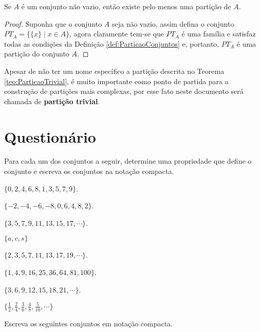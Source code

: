 \begin{teorema}\label{teo:ParticaoTrivial}
	Se $A$ é um conjunto não vazio, então existe pelo menos uma partição de $A$.
\end{teorema}

\begin{proof}
	Suponha que o conjunto $A$ seja não vazio, assim defina o conjunto $PT_A = \{\{x\} \mid x \in A\}$, agora claramente tem-se que $PT_A$ é uma família e satisfaz todas as condições da Definição \ref{def:ParticaoConjuntos} e, portanto, $PT_A$ é uma partição do conjunto $A$.
\end{proof}

\begin{nota}
  Apesar de não ter um nome específico a partição descrita no Teorema \ref{teo:ParticaoTrivial}, é muito importante como ponto de partida para a construção de partições mais complexas, por esse fato neste documento será chamada de \textbf{partição trivial}.
\end{nota}

\section{Questionário}\label{sec:Questionario1part1}

\begin{questao}\label{test:Conjuntos1}
	Para cada um dos conjuntos a seguir, determine uma propriedade que define o conjunto e escreva os conjuntos na notação compacta.
\end{questao}

\begin{exerList}
	\item $\{0,2,4,6,8,1,3,5,7,9\}$.
	\item $\{-2, -4, -6, -8, 0, 6, 4, 8, 2\}$.
	\item $\{3, 5, 7, 9, 11, 13, 15, 17, \cdots\}$.
	\item $\{a, c, s\}$
	\item $\{2, 3, 5, 7, 11, 13, 17, 19, \cdots\}$.
	\item $\{1, 4, 9, 16, 25, 36, 64, 81, 100\}$.
	\item $\{3, 6, 9, 12, 15, 18, 21, \cdots\}$.
	\item $\Big\{\frac{1}{2}, \frac{2}{4}, \frac{3}{6}, \frac{4}{8}, \frac{5}{10}, \cdots\Big\}$
\end{exerList}

\begin{questao}\label{test:Conjuntos2}
	Escreva os seguintes conjuntos em notação compacta.
\end{questao}

